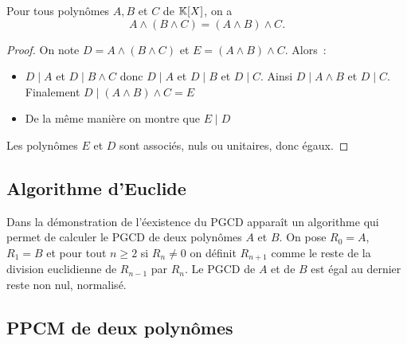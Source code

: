 \begin{prop}[Associativité]
  Pour tous polynômes $A,B$ et $C$ de $\mathbb{K}[X]$, on a
  \begin{equation}
    A \wedge (B\wedge C) = (A\wedge B) \wedge C.
  \end{equation}
\end{prop}
\begin{proof}
  On note $D=A \wedge (B\wedge C)$ et $E=(A\wedge B) \wedge C$. Alors~:
  \begin{itemize}
  \item $D\mid{}A$ et $D\mid{}B \wedge C$ donc $D\mid{}A$ et $D\mid{}B$ et $D\mid{} C$. Ainsi $D\mid{}A \wedge B$ et $D\mid{}C$. Finalement $D\mid{}(A\wedge B) \wedge C=E$
  \item De la même manière on montre que $E\mid{}D$
  \end{itemize}
  Les polynômes $E$ et $D$ sont associés, nuls ou unitaires, donc égaux.
\end{proof}

\subsection{Algorithme d'Euclide}

Dans la démonstration de l'éexistence du PGCD apparaît un algorithme qui permet de calculer le PGCD de deux polynômes $A$ et $B$. On pose $R_0=A$, $R_1=B$ et pour tout $n\geqslant 2$
 si $R_n \neq 0$ on définit $R_{n+1}$ comme le reste de la division euclidienne de $R_{n-1}$ par $R_n$. Le PGCD de $A$ et de $B$ est égal au dernier reste non nul, normalisé.

\subsection{PPCM de deux polynômes}

